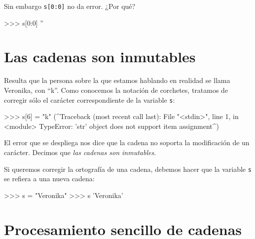 Sin embargo \lstinline+s[0:0]+ no da error. ¿Por qué?

\begin{codigo-python-sn}
>>> s[0:0]
''
\end{codigo-python-sn}



\section{Las cadenas son inmutables}

Resulta que la persona sobre la que estamos hablando en realidad se llama
Veronika, con \enquote{k}.  Como conocemos la notación de corchetes,
tratamos de corregir sólo el carácter correspondiente de la variable
\lstinline!s!:

\begin{codigo-python-sn}
>>> s[6] = "k"
(^Traceback (most recent call last):
  File "<stdin>", line 1, in <module>
TypeError: 'str' object does not support item assignment^)
\end{codigo-python-sn}

El error que se despliega nos dice que la cadena no soporta
la modificación de un carácter. Decimos que \emph{las cadenas
son inmutables}.

Si queremos corregir la ortografía de una cadena, debemos hacer
que la variable \lstinline!s! se refiera a una nueva cadena:

\begin{codigo-python-sn}
>>> s = "Veronika"
>>> s
'Veronika'
\end{codigo-python-sn}

\section{Procesamiento sencillo de cadenas}


